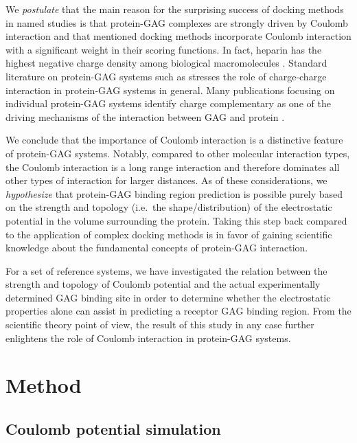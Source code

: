 We \textit{postulate} that the main reason for the surprising success of docking
methods in named studies is that protein-GAG complexes are strongly driven by
Coulomb interaction and that mentioned docking methods incorporate Coulomb
interaction with a significant weight in their scoring functions. In fact,
heparin has the highest negative charge density among biological macromolecules
\cite{capila_linhardt_hep_prot_2002}. Standard literature on protein-GAG systems
such as \cite{essentials_glycobiology_gags_2009,gandhi_structure_2008} stresses
the role of charge-charge interaction in protein-GAG systems in general. Many
publications focusing on individual protein-GAG systems identify charge
complementary as one of the driving mechanisms of the interaction between GAG
and protein
\cite{gandhi_bmp_heparin_binding_sites_2012,faham_heparin_1996,%
pichert_characterization_2012,rogers_gag_prot_prot_2011}.

We conclude that the importance of Coulomb interaction is a distinctive feature
of protein-GAG systems. Notably, compared to other molecular interaction types,
the Coulomb interaction is a long range interaction and therefore dominates all
other types of interaction for larger distances. As of these considerations, we
\textit{hypothesize} that protein-GAG binding region prediction is possible
purely based on the strength and topology (i.e.\ the shape/distribution) of the
electrostatic potential in the volume surrounding the protein. Taking this step
back compared to the application of complex docking methods is in favor of
gaining scientific knowledge about the fundamental concepts of protein-GAG
interaction.

For a set of reference systems, we have investigated the relation between the
strength and topology of Coulomb potential and the actual experimentally
determined GAG binding site in order to determine whether the electrostatic
properties alone can assist in predicting a receptor GAG binding region. From
the scientific theory point of view, the result of this study in any case
further enlightens the role of Coulomb interaction in protein-GAG systems.


\section{Method}

\subsection{Coulomb potential simulation}

